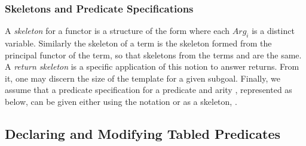 
\subsubsection*{Skeletons and Predicate Specifications}


A \emph{skeleton} for a functor  is a structure of the form
 where each $Arg_i$ is a distinct
variable.  Similarly the skeleton of a term is the skeleton formed
from the principal functor of the term, so that skeletons from the
terms  and  are the same.  A \emph{return
  skeleton} is a specific application of this notion to answer
returns.  From it, one may discern the size of the template for a
given subgoal.  Finally, we assume that a predicate specification for
a predicate  and arity , represented as
 below, can be given either using the notation
 or as a skeleton, .



\subsection{Declaring and Modifying Tabled Predicates}
\label{sec:TablePred:Decl&Mod}

